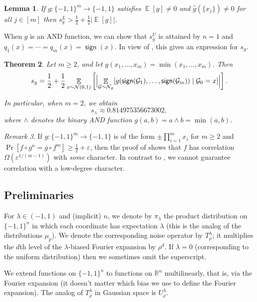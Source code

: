 \documentclass{article}
\newtheorem{theorem}{Theorem}[section]
\newtheorem{lemma}[theorem]{Lemma}
\theoremstyle{definition}
\theoremstyle{remark}
\newtheorem{remark}[theorem]{Remark}
\DeclareMathOperator*{\E}{\mathbb{E}}
\providecommand{\cG}{\mathcal{G}}
\providecommand{\normal}{\mathcal{N}}
\providecommand{\normalg}[1]{\normal_{#1}}
\providecommand{\stdnormal}{\normal(0,1)}
\DeclareMathOperator{\sgn}{\mathsf{sign}}
\newcommand\eps{\varepsilon}
\renewcommand\epsilon{\eps}
\renewcommand\geq{\geqslant}
\begin{document}
\begin{lemma} \label{lem:sg-nontrivial}
If $g\colon \{-1,1\}^m \to \{-1,1\}$ satisfies $\E[g] \neq 0$ and $\hat{g}(\{x_j\}) \neq 0$ for all $j \in [m]$ then $s_g^L > \frac{1}{2} + \frac{1}{2} |\E[g]|$.
\end{lemma}

When $g$ is an AND function,  we can show that $s_g^U$ is attained by $n = 1$ and $q_1(x) = \cdots = q_m(x) = \sgn(x)$. In view of , this gives an expression for $s_g$.

\begin{theorem} \label{thm:sg-AND}
Let $m \geq 2$, and let $g(x_1,\ldots,x_m) = \min(x_1,\ldots,x_m)$. Then
\[
 s_g = 
 \frac{1}{2} + \frac{1}{2}
 \E_{x \sim \stdnormal}
 \left[\Bigl|
 \E_{\cG \sim \normalg{g}}[g(\sgn(\cG_1), \ldots, \sgn(\cG_m)) \mid \cG_0 = x]
 \Bigr|\right].
\]

In particular, when $m = 2$, we obtain
\[
 s_\land \approx 0.814975356673002,
\]
where $\land$ denotes the binary AND function $g(a,b) = a \land b = \min(a,b)$.
\end{theorem}

\begin{remark}
If $g\colon \{-1,1\}^m \to \{-1,1\}$ is of the form $\pm \prod_{i=1}^m x_i$ for $m \geq 2$ and $\Pr[f \circ g^n = g \circ f^m] \geq \frac{1}{2} + \epsilon$, then the proof of  shows that $f$ has correlation $\Omega(\epsilon^{1/(m-1)})$ with \emph{some} character. In contrast to , we cannot guarantee correlation with a low-degree character.
\end{remark}

\subsection{Preliminaries}

For $\lambda \in (-1,1)$ and (implicit) $n$, we denote by $\pi_\lambda$ the product distribution on $\{-1,1\}^n$ in which each coordinate has expectation $\lambda$ (this is the analog of the distributions $\mu_p$).
We denote the corresponding noise operator by $T_\rho^{\lambda}$; it multiplies the $d$th level of the $\lambda$-biased Fourier expansion by $\rho^d$. If $\lambda = 0$ (corresponding to the uniform distribution) then we sometimes omit the superscript.

We extend functions on $\{-1,1\}^n$ to functions on $\mathbb{R}^n$ multilinearly, that is, via the Fourier expansion (it doesn't matter which bias we use to define the Fourier expansion). The analog of $T_\rho^\lambda$ in Gaussian space is $U_\rho^\lambda$.
\end{document}
